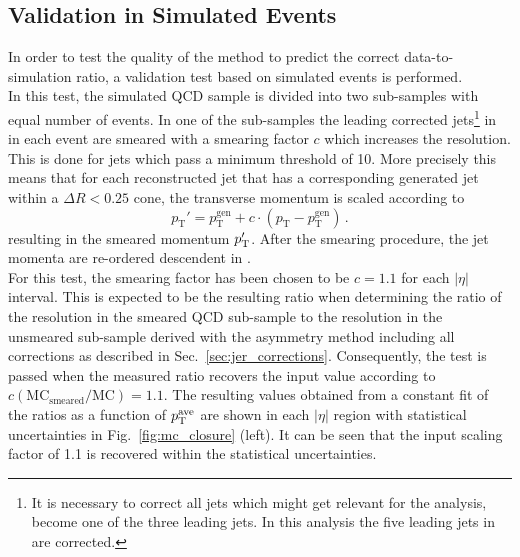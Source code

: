 \subsection{Validation in Simulated Events}
\label{sec:jer_validation_closure}
In order to test the quality of the method to predict the correct data-to-simulation ratio, a validation test based on simulated events is performed. \\ 
In this test, the simulated \pythia QCD sample is divided into two sub-samples with equal number of events. In one of the sub-samples the leading corrected jets\footnote{It is necessary to correct all jets which might get relevant for the analysis, \ie become one of the three leading jets. In this analysis the five leading jets in \pt are corrected.} in \pt in each event are smeared with a smearing factor $c$ which increases the \pt resolution. This is done for jets which pass a minimum \pt threshold of 10\gev. More precisely this means that for each reconstructed jet that has a corresponding generated jet within a $\Delta R < 0.25$ cone, the transverse momentum is scaled according to
\begin{equation}
 p_\mathrm{T}' = p^\mathrm{gen}_\mathrm{T} + c \cdot (p_\mathrm{T} - p^\mathrm{gen}_\mathrm{T}) \, .
\label{eq:smear_gen}
\end{equation} 
resulting in the smeared momentum $p_{\text{T}}'$. After the smearing procedure, the jet momenta are re-ordered descendent in \pt.\\
For this test, the smearing factor has been chosen to be $c = 1.1$ for each $|\eta|$ interval. This is expected to be the resulting ratio when determining the ratio of the resolution in the smeared QCD sub-sample to the resolution in the unsmeared sub-sample derived with the asymmetry method including all corrections as described in Sec.~\ref{sec:jer_corrections}. Consequently, the test is passed when the measured ratio recovers the input value according to $c\mathrm{(MC_{smeared}/MC)} = 1.1$. The resulting values obtained from a constant fit of the ratios as a function of $p_{\text{T}}^\mathrm{ave}$ are shown in each $|\eta|$ region with statistical uncertainties in Fig.~\ref{fig:mc_closure} (left). It can be seen that the input scaling factor of 1.1 is recovered within the statistical uncertainties.

